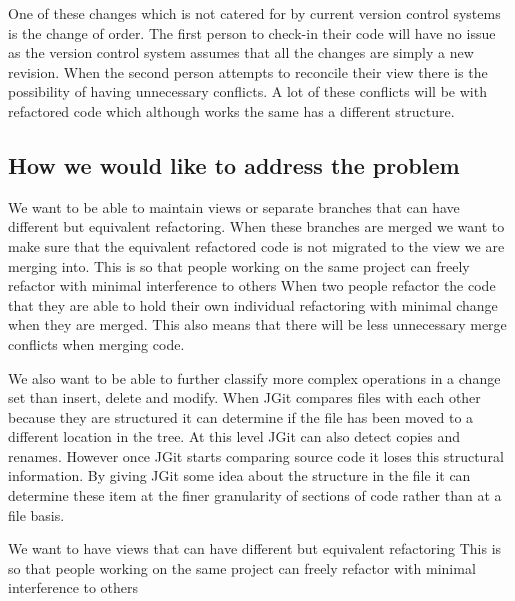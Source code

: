 

One of these changes which is not catered for by current version control systems is the change of order.  The first person to check-in their code will have no issue as the version control system assumes that all the changes are simply a new revision.  When the second person attempts to reconcile their view there is the possibility of having unnecessary conflicts.  A lot of these conflicts will be with refactored code which although works the same has a different structure.

\subsection{How we would like to address the problem}
We want to be able to maintain views or separate branches that can have different but equivalent refactoring.  When these branches are merged we want to make sure that the equivalent refactored code is not migrated to the view we are merging into.
This is so that people working on the same project can freely refactor with minimal interference to others
When two people refactor the code that they are able to hold their own individual refactoring with minimal change when they are merged.
This also means that there will be less unnecessary merge conflicts when merging code.

We also want to be able to further classify more complex operations in a change set than insert, delete and modify.  When JGit compares files with each other because they are structured it can determine if the file has been moved to a different location in the tree.  At this level JGit can also detect copies and renames.  However once JGit starts comparing source code it loses this structural information.  By giving JGit some idea about the structure in the file it can determine these item at the finer granularity of sections of code rather than at a file basis.

We want to have views that can have different but equivalent refactoring
This is so that people working on the same project can freely refactor with minimal interference to others









